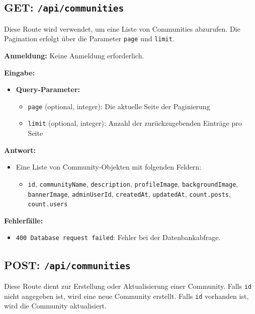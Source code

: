 \documentclass[a4paper,12pt]{article}
\begin{document}
\newpage
\subsection{GET: \texttt{/api/communities}}

Diese Route wird verwendet, um eine Liste von Communities abzurufen. Die Pagination erfolgt über die Parameter \texttt{page} und \texttt{limit}.

\textbf{Anmeldung:} Keine Anmeldung erforderlich.

\textbf{Eingabe:}
\begin{itemize}
    \item \textbf{Query-Parameter:}
    \begin{itemize}
        \item \texttt{page} (optional, integer): Die aktuelle Seite der Paginierung
        \item \texttt{limit} (optional, integer): Anzahl der zurückzugebenden Einträge pro Seite
    \end{itemize}
\end{itemize}

\textbf{Antwort:}
\begin{itemize}
    \item Eine Liste von Community-Objekten mit folgenden Feldern:
    \begin{itemize}
        \item \texttt{id}, \texttt{communityName}, \texttt{description}, \texttt{profileImage}, \texttt{backgroundImage}, \texttt{bannerImage}, \texttt{adminUserId}, \texttt{createdAt}, \texttt{updatedAt}, \texttt{count.posts}, \texttt{count.users}
    \end{itemize}
\end{itemize}

\textbf{Fehlerfälle:}
\begin{itemize}
    \item \texttt{400 Database request failed}: Fehler bei der Datenbankabfrage.
\end{itemize}

\newpage
\subsection{POST: \texttt{/api/communities}}

Diese Route dient zur Erstellung oder Aktualisierung einer Community. Falls \texttt{id} nicht angegeben ist, wird eine neue Community erstellt. Falls \texttt{id} vorhanden ist, wird die Community aktualisiert.
\end{document}
